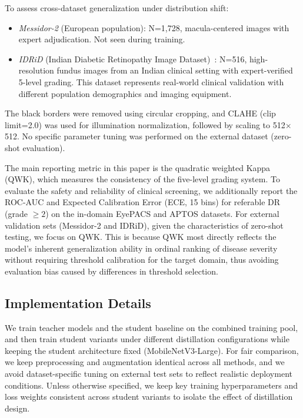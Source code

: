 \documentclass{article}
\begin{document}
To assess cross-dataset generalization under distribution shift:
\begin{itemize}[leftmargin=*,itemsep=1pt,topsep=1pt]
    \item \textit{Messidor-2} (European population): N=1,728, macula-centered images with expert adjudication. Not seen during training.
    \item \textit{IDRiD} (Indian Diabetic Retinopathy Image Dataset)~\cite{porwal2018indian}: N=516, high-resolution fundus images from an Indian clinical setting with expert-verified 5-level grading. This dataset represents real-world clinical validation with different population demographics and imaging equipment.
\end{itemize}

The black borders were removed using circular cropping, and CLAHE (clip limit=2.0) was used for illumination normalization, followed by scaling to 512$\times$512. No specific parameter tuning was performed on the external dataset (zero-shot evaluation).

The main reporting metric in this paper is the quadratic weighted Kappa (QWK), which measures the consistency of the five-level grading system. To evaluate the safety and reliability of clinical screening, we additionally report the ROC-AUC and Expected Calibration Error (ECE, 15 bins) for referable DR (grade $\geq 2$) on the in-domain EyePACS and APTOS datasets. For external validation sets (Messidor-2 and IDRiD), given the characteristics of zero-shot testing, we focus on QWK. This is because QWK most directly reflects the model's inherent generalization ability in ordinal ranking of disease severity without requiring threshold calibration for the target domain, thus avoiding evaluation bias caused by differences in threshold selection.

\subsection{Implementation Details}
We train teacher models and the student baseline on the combined training pool, and then train student variants under different distillation configurations while keeping the student architecture fixed (MobileNetV3-Large). For fair comparison, we keep preprocessing and augmentation identical across all methods, and we avoid dataset-specific tuning on external test sets to reflect realistic deployment conditions. Unless otherwise specified, we keep key training hyperparameters and loss weights consistent across student variants to isolate the effect of distillation design.
\end{document}
